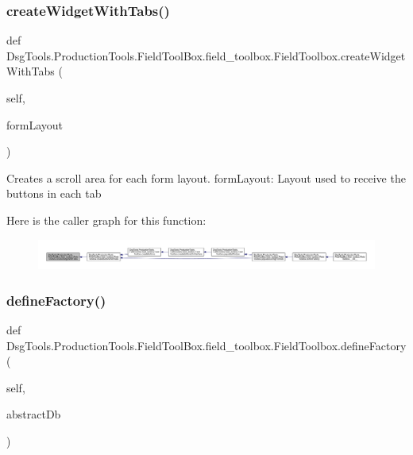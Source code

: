 \subsubsection{\texorpdfstring{create\+Widget\+With\+Tabs()}{createWidgetWithTabs()}}
{\footnotesize\ttfamily def Dsg\+Tools.\+Production\+Tools.\+Field\+Tool\+Box.\+field\+\_\+toolbox.\+Field\+Toolbox.\+create\+Widget\+With\+Tabs (\begin{DoxyParamCaption}\item[{}]{self,  }\item[{}]{form\+Layout }\end{DoxyParamCaption})}

\begin{DoxyVerb}Creates a scroll area for each form layout.
formLayout: Layout used to receive the buttons in each tab
\end{DoxyVerb}
 Here is the caller graph for this function\+:
\nopagebreak
\begin{figure}[H]
\begin{center}
\leavevmode
\includegraphics[width=350pt]{class_dsg_tools_1_1_production_tools_1_1_field_tool_box_1_1field__toolbox_1_1_field_toolbox_a99905e3b42dd4929e874d81615729732_icgraph}
\end{center}
\end{figure}
\mbox{\label{class_dsg_tools_1_1_production_tools_1_1_field_tool_box_1_1field__toolbox_1_1_field_toolbox_a6c2f8a2403ed6d0283fba1c7b5e1a602}} 
\subsubsection{\texorpdfstring{define\+Factory()}{defineFactory()}}
{\footnotesize\ttfamily def Dsg\+Tools.\+Production\+Tools.\+Field\+Tool\+Box.\+field\+\_\+toolbox.\+Field\+Toolbox.\+define\+Factory (\begin{DoxyParamCaption}\item[{}]{self,  }\item[{}]{abstract\+Db }\end{DoxyParamCaption})}

